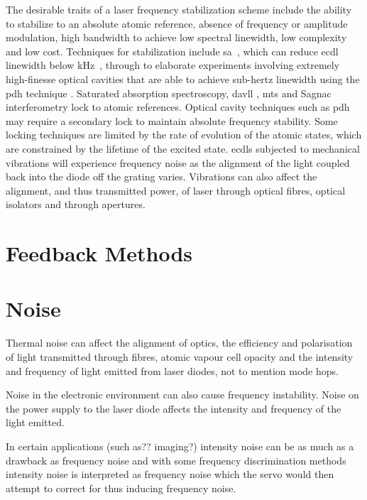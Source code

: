 The desirable traits of a laser frequency stabilization scheme include the ability to stabilize to an absolute atomic reference, absence of frequency or amplitude modulation, high bandwidth to achieve low spectral linewidth, low complexity and low cost.
Techniques for stabilization include \gls*{sa}~\cite{maguire_theoretical_2006, haroche_theory_1972, preston_doppler-free_1996}, which can reduce \gls*{ecdl} linewidth below \unit[100]{kHz}~\cite{cuneo_optically_1994, saliba_linewidths_2009}, through to elaborate experiments involving extremely high-finesse optical cavities that are able to achieve sub-hertz linewidth using the \gls*{pdh} technique \cite{ludlow_compact_2007}.
Saturated absorption spectroscopy, \gls*{davll} \cite{corwin_frequency-stabilized_1998,millett-sikking_davll_2007}, \gls*{mts} \cite{shirley_modulation_1982, mccarron_modulation_2008,xiang-hui_ultra-stable_2009} and Sagnac interferometry \cite{robins_Interferometric_2002,jundt_non-linear_2003} lock to atomic references.
Optical cavity techniques such as \gls*{pdh} \cite{drever_laser_1983} may require a secondary lock to maintain absolute frequency stability.
Some locking techniques are limited by the rate of evolution of the atomic states, which are constrained by the lifetime of the excited state.
\Glspl{ecdl} subjected to mechanical vibrations will experience frequency noise as the alignment of the light coupled back into the diode off the grating varies.
Vibrations can also affect the alignment, and thus transmitted power, of laser through optical fibres, optical isolators and through apertures.

\section{Feedback Methods}

\section{Noise}
Thermal noise can affect the alignment of optics, the efficiency and polarisation of light transmitted through fibres, atomic vapour cell opacity and the intensity and frequency of light emitted from laser diodes, not to mention mode hops.

Noise in the electronic environment can also cause frequency instability. Noise on the power supply to the laser diode affects the intensity and frequency of the light emitted.

In certain applications {\color{red}(such as?? imaging?)} intensity noise can be as much as a drawback as frequency noise and with some frequency discrimination methods intensity noise is interpreted as frequency noise which the servo would then attempt to correct for thus inducing frequency noise.

